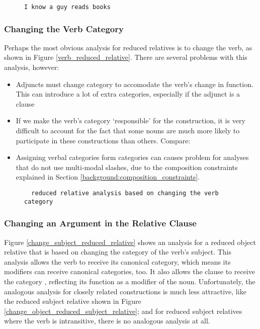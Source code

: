 \begin{figure}
\begin{verbatim}
I know a guy reads books
\end{verbatim}
\label{weird_subject_relative}
\end{figure}

\subsubsection{Changing the Verb Category}
\label{rrc_verb_change}
Perhaps the most obvious \ccg analysis for reduced relatives is to change the verb, as shown in Figure \ref{verb_reduced_relative}. There are several problems with this analysis, however:

\begin{itemize}
\item Adjuncts must change category to accomodate the verb's change in function. This can introduce a lot of extra categories, especially if the adjunct is a clause
\item If we make the verb's category `responsible' for the construction, it is very difficult to account for the fact that some nouns are much more likely to participate in these constructions than others. Compare:\\
\item Assigning verbal categories  form categories can causes problem for analyses that do not use multi-modal slashes, due to the composition constraints explained in Section \ref{background:composition_constraints}.
\end{itemize}

\begin{figure}
 \begin{verbatim}
  reduced relative analysis based on changing the verb category
 \end{verbatim}
\label{change_verb_reduced_relative}
\end{figure}

\subsubsection{Changing an Argument in the Relative Clause}
\label{section:rrc_argument}

Figure \ref{change_subject_reduced_relative} shows an analysis for a reduced object relative that is based on changing the category of the verb's subject. This analysis allows the verb to receive its canonical category, which means its modifiers can receive canonical categories, too. It also allows the clause to receive the category , reflecting its function as a modifier of the noun. Unfortunately, the analogous analysis for closely related constructions is much less attractive, like the reduced subject relative shown in Figure \ref{change_object_reduced_subject_relative}; and for reduced subject relatives where the verb is intransitive, there is no analogous analysis at all.

